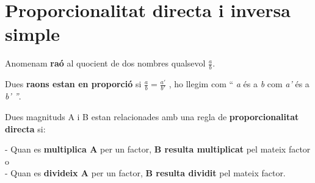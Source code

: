 \section{Proporcionalitat directa i inversa simple}

\begin{theorybox}
  Anomenam \textbf{raó} al quocient de dos nombres qualsevol
  \(\frac{a}{b}\).

  Dues \textbf{raons estan en proporció} si
  \(\frac{a}{b} = \frac{a'}{b'}\) , ho llegim com `` \emph{a} és a
  \emph{b} com \emph{a'} és a \emph{b' ''}.

  Dues magnituds A i B estan relacionades amb una regla de
  \textbf{proporcionalitat directa} si:

  - Quan es \textbf{multiplica A} per un factor, \textbf{B resulta
  multiplicat} pel mateix factor o\\
  - Quan es \textbf{divideix A} per un factor, \textbf{B resulta
  dividit} pel mateix factor.
\end{theorybox}


